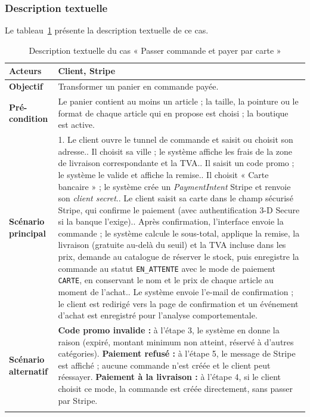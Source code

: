 \subsubsection{Description textuelle}
Le tableau~\ref{tab:uc-commande} présente la description textuelle de ce cas.
\renewcommand{\arraystretch}{1.5}
\begin{longtable}{|p{4cm}|p{11cm}|}
\hline
\textbf{Acteurs} & Client, Stripe \\
\hline
\textbf{Objectif} & Transformer un panier en commande payée. \\
\hline
\textbf{Pré-condition} & Le panier contient au moins un article ; la taille, la pointure ou le format de chaque article qui en propose est choisi ; la boutique est active. \\
\hline
\textbf{Scénario principal} &
1. Le client ouvre le tunnel de commande et saisit ou choisit son adresse.\newline
2. Il choisit sa ville ; le système affiche les frais de la zone de livraison correspondante et la TVA.\newline
3. Il saisit un code promo ; le système le valide et affiche la remise.\newline
4. Il choisit « Carte bancaire » ; le système crée un \textit{PaymentIntent} Stripe et renvoie son \textit{client secret}.\newline
5. Le client saisit sa carte dans le champ sécurisé Stripe, qui confirme le paiement (avec authentification 3-D Secure si la banque l'exige).\newline
6. Après confirmation, l'interface envoie la commande ; le système calcule le sous-total, applique la remise, la livraison (gratuite au-delà du seuil) et la TVA incluse dans les prix, demande au catalogue de réserver le stock, puis enregistre la commande au statut \texttt{EN\_ATTENTE} avec le mode de paiement \texttt{CARTE}, en conservant le nom et le prix de chaque article au moment de l'achat.\newline
7. Le système envoie l'e-mail de confirmation ; le client est redirigé vers la page de confirmation et un événement d'achat est enregistré pour l'analyse comportementale. \\
\hline
\textbf{Scénario alternatif} &
\textbf{Code promo invalide :} à l'étape 3, le système en donne la raison (expiré, montant minimum non atteint, réservé à d'autres catégories).\newline
\textbf{Paiement refusé :} à l'étape 5, le message de Stripe est affiché ; aucune commande n'est créée et le client peut réessayer.\newline
\textbf{Paiement à la livraison :} à l'étape 4, si le client choisit ce mode, la commande est créée directement, sans passer par Stripe. \\
\hline
\caption{Description textuelle du cas « Passer commande et payer par carte »}
\label{tab:uc-commande}
\end{longtable}

